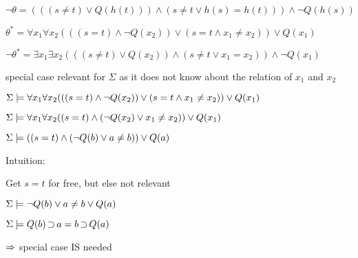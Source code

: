 \documentclass[,%
			paper=a4,%
			landscape,
			DIV18,
			liststotoc,
			bibtotoc,
			draft=false,%
			numbers=noendperiod
			]{scrartcl}
\theoremstyle{definition}
\begin{document}
$\lnot \theta = (((s\neq t) \lor Q(h(t))) \land (s\neq t \lor h(s) = h(t))) \land \lnot Q(h(s))  $

$\theta^* = \forall x_1 \forall x_2 (((s=t) \land \lnot Q(x_2)) \lor (s=t \land x_1 \neq x_2)) \lor Q(x_1)  $

$\lnot \theta^* = \exists x_1 \exists x_2 (((s\neq t) \lor Q(x_2)) \land (s\neq t \lor x_1 = x_2)) \land \lnot Q(x_1)  $
\bigskip

special case relevant for $\Sigma$ as it does not know about the relation of $x_1$ and $x_2$

$\Sigma \models \forall x_1 \forall x_2 (((s=t) \land \lnot Q(x_2)) \lor (s=t \land x_1 \neq x_2)) \lor Q(x_1)  $


$\Sigma \models \forall x_1 \forall x_2 ((s=t) \land (\lnot Q(x_2) \lor x_1 \neq x_2)) \lor Q(x_1)  $

$\Sigma \models ((s=t) \land (\lnot Q(b) \lor a \neq b)) \lor Q(a)  $

Intuition: 

Get $s=t$ for free, but else not relevant

$\Sigma \models \lnot Q(b) \lor a \neq b \lor Q(a)  $

$\Sigma \models Q(b) \operatorname{\supset} a = b \operatorname{\supset} Q(a)  $



	{
		\Large 

	$ \Rightarrow$ special case IS needed 
}


\begin{comment}
$\Sigma = \{ c=d, \lnot C(x) \}$

$\Pi = \{ P(f(c)) \lor Q(f(c)) \lor C(f(c), \lnot P(f(d), \lnot Q(f(d)) \}$

\begin{prooftree}
	\AxiomCm{\p{P(f(c)) \lor Q(f(c))\lor C(f(c))}}
	\AxiomCm{\sig{\lnot C(x)}}
	\BinaryInfCm{P(f(c)) \lor Q(f(c))}
	\AxiomCm{\sig{c=d}}
	\BinaryInfCm{P(f(d) \lor Q(f(d))}
	\AxiomCm{\p{\lnot P(f(d))}}
	\BinaryInfCm{Q(f(d))}
	\AxiomCm{\p{\lnot Q(f(d))}}
	\BinaryInfCm{\square}
\end{prooftree}

\begin{prooftree}
	\AxiomCm{\top}
	\AxiomCm{\bot}
	\BinaryInfCm{\lnot C(f(c))}
	\AxiomCm{\bot}
	\BinaryInfCm{ (c=d \land \lnot C(f(c))) \lor (c\neq d \land \bot) \lor (c=d \land f(c)\neq f(d) \equiv (c=d \land \lnot C(f(c))) \lor (c=d \land f(c)\neq f(d))  }
	\AxiomCm{\top}
	\BinaryInfCm{ (c=d \land \lnot C(f(c)) \lor (c=d \land f(c)\neq f(d)) \land \top }
	\AxiomCm{\top}
	\BinaryInfCm{ (c=d \land \lnot C) \lor (c=d \land f(c)\neq f(d)) \land \top }
\end{prooftree}

$	(c=d \land \lnot C(f(c))) \lor (c=d \land f(c)\neq f(d)) $

max $\Pi$-terms: $f(c), f(d)$

$\theta^* = \forall x_1 \forall x_2
	(c=d \land \lnot C(x_1)) \lor (c=d \land x_1\neq x_2) $

	$\Ra \Sigma \proves \theta^*; \Pi \proves \lnot \theta^*$

	\bigskip
\end{comment}
\end{document}
